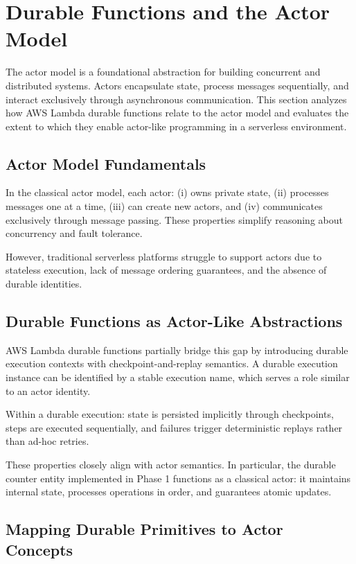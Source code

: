 \section{Durable Functions and the Actor Model}
\label{sec:actors}

The actor model is a foundational abstraction for building concurrent and distributed systems. Actors encapsulate state, process messages sequentially, and interact exclusively through asynchronous communication. This section analyzes how AWS Lambda durable functions relate to the actor model and evaluates the extent to which they enable actor-like programming in a serverless environment.

\subsection{Actor Model Fundamentals}

In the classical actor model, each actor:
(i) owns private state,
(ii) processes messages one at a time,
(iii) can create new actors, and
(iv) communicates exclusively through message passing.
These properties simplify reasoning about concurrency and fault tolerance.

However, traditional serverless platforms struggle to support actors due to stateless execution, lack of message ordering guarantees, and the absence of durable identities.

\subsection{Durable Functions as Actor-Like Abstractions}

AWS Lambda durable functions partially bridge this gap by introducing durable execution contexts with checkpoint-and-replay semantics. A durable execution instance can be identified by a stable execution name, which serves a role similar to an actor identity.

Within a durable execution:
state is persisted implicitly through checkpoints,
steps are executed sequentially,
and failures trigger deterministic replays rather than ad-hoc retries.

These properties closely align with actor semantics. In particular, the durable counter entity implemented in Phase 1 functions as a classical actor: it maintains internal state, processes operations in order, and guarantees atomic updates.

\subsection{Mapping Durable Primitives to Actor Concepts}


